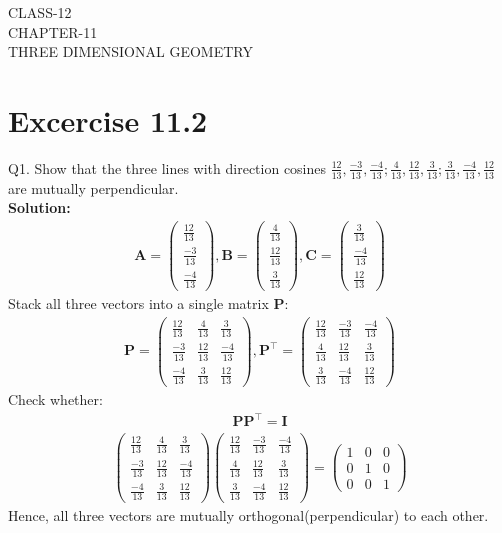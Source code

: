 \documentclass[12pt]{article}
\newcommand{\solution}{\noindent \textbf{Solution: }}
\newcommand{\myvec}[1]{\ensuremath{\begin{pmatrix}#1\end{pmatrix}}}
\let\vec\mathbf
\begin{document}
\begin{center}
\textbf\large{CLASS-12 \\ CHAPTER-11 \\ THREE DIMENSIONAL GEOMETRY}
\end{center}
\section*{Excercise 11.2}

Q1. Show that the three lines with direction cosines $\frac{12}{13}, \frac{-3}{13}, \frac{-4}{13}; \frac{4}{13}, \frac{12}{13}, \frac{3}{13}; \frac{3}{13}, \frac{-4}{13}, \frac{12}{13}$ are mutually perpendicular.
\\
\solution
		\begin{align}
			\vec{A}=\myvec{\frac{12}{13}\\[2pt]\frac{-3}{13}\\[2pt]\frac{-4}{13}},\vec{B}=\myvec{\frac{4}{13}\\[2pt]\frac{12}{13}\\[2pt]\frac{3}{13}},\vec{C}=\myvec{\frac{3}{13}\\[2pt]\frac{-4}{13}\\[2pt]\frac{12}{13}}
		\end{align}
			Stack all three vectors into a single matrix $\vec{P}$:
			\begin{align}
				\vec{P}=\myvec{\frac{12}{13}&\frac{4}{13}    &\frac{3}{13}\\[2pt] \frac{-3}{13}&\frac{12}{13}&\frac{-4}{13}\\[2pt] \frac{-4}{13}&\frac{3}{13}&\frac{12}{13}}, \vec{P}^\top=\myvec{\frac{12}{13}&\frac{-3}{13}   &\frac{-4}{13}\\[2pt] \frac{4}{13}&\frac{12}{13}&\frac{3}{13}\\[2pt] \frac{3}{13}&\frac{-4}{13}&\frac{12}{13}}
			\end{align}
	Check whether:
		\begin{align}
		\vec{P}\vec{P}^\top=\vec{I}
		\end{align}
		\begin{align}
			\myvec{\frac{12}{13}&\frac{4}{13}    &\frac{3}{13}\\[2pt] \frac{-3}{13}&\frac{12}{13}&\frac{-4}{13}\\[2pt] \frac{-4}{13}&\frac{3}{13}&\frac{12}{13}}\myvec{\frac{12}{13}&\frac{-3}{13}   &\frac{-4}{13}\\[2pt] \frac{4}{13}&\frac{12}{13}&\frac{3}{13}\\[2pt] \frac{3}{13}&\frac{-4}{13}&\frac{12}{13}}=\myvec{1&0&0\\[2pt]0&1&0\\[2pt]0&0&1}
		\end{align}
		Hence, all three vectors are mutually orthogonal(perpendicular) to each other.
\end{document}
